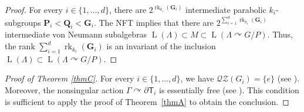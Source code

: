 \documentclass[JEP,XML,SOM,Unicode,published]{cedram}
\newcommand{\bG}{\boldsymbol{G}}
\newcommand{\bP}{\boldsymbol{P}}
\newcommand{\bQ}{\boldsymbol{Q}}
\theoremstyle{definition}
\DeclareMathOperator{\rk}{rk}
\DeclareMathOperator{\rL}{L}
\begin{document}
\begin{proof}
For every $i \in \{1, \dots, d\}$, there are $2^{\rk_{k_i}(\bG_i)}$ intermediate parabolic $k_i$-subgroups $\bP_i < \bQ_i < \bG_i$. The NFT implies that there are $2^{\sum_{i = 1}^d \rk_{k_i}(\bG_i)}$ intermediate von Neumann subalgebras $\rL(\Lambda) \subset M \subset \rL(\Lambda \curvearrowright G/P)$. Thus, the rank $\sum_{i = 1}^d \rk_{k_i}(\bG_i)$ is an invariant of the inclusion $\rL(\Lambda) \subset \rL(\Lambda \curvearrowright G/P)$.
\end{proof}

\begin{proof}[Proof of Theorem \ref{thmC}]
For every $i \in \{1, \dots, d\}$, we have $\mathscr{Q}\mathscr{Z}(G_i) = \{e\}$ (see \cite[Lem.\,3.1.1 \& Prop.\,3.1.2]{BM00a}). Moreover, the nonsingular action $\Gamma \curvearrowright \partial \mathsf T_i$ is essentially free (see \cite[Prop.\,6.4]{BBHP20}). This condition is sufficient to apply the proof of Theorem~\ref{thmA} to obtain the conclusion.
\end{proof}

\backmatter


\end{document}
